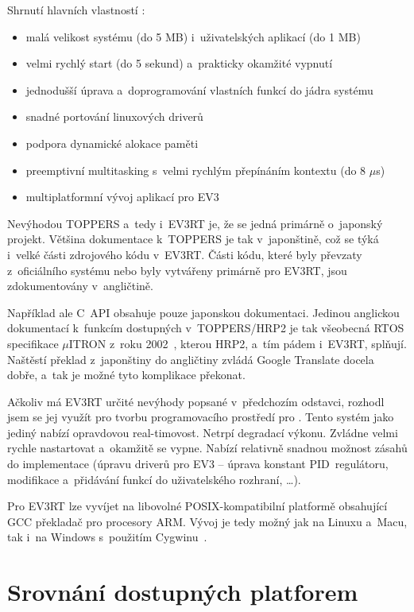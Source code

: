 Shrnutí hlavních vlastností \evRT:

\begin{itemize}
	\item malá velikost systému (do 5 MB) i~uživatelských aplikací (do 1 MB)
	\item velmi rychlý start (do 5 sekund) a~prakticky okamžité vypnutí
	\item jednodušší úprava a~doprogramování vlastních funkcí do jádra systému
	\item snadné portování linuxových driverů
	\item podpora dynamické alokace paměti
	\item preemptivní multitasking s~velmi rychlým přepínáním kontextu (do 8 $\mu$s)
	\item multiplatformní vývoj aplikací pro EV3
\end{itemize}
 
Nevýhodou TOPPERS a~tedy i~EV3RT je, že se jedná primárně o~japonský projekt. 
Většina dokumentace k~TOPPERS je tak v~japonštině, což se týká i~velké části zdrojového kódu v~EV3RT. 
Části kódu, které byly převzaty z~oficiálního \lego{} systému nebo byly vytvářeny primárně pro EV3RT, jsou zdokumentovány v~angličtině. 

Například ale C~API obsahuje pouze japonskou dokumentaci.
Jedinou anglickou dokumentací k~funkcím dostupných v~TOPPERS/HRP2 je tak všeobecná RTOS specifikace $\mu$ITRON z~roku 2002~\cite{legoProgramingPlatform_TOPPERS-IRON}, kterou HRP2, a~tím pádem i~EV3RT, splňují. %
Naštěstí překlad z~japonštiny do angličtiny zvládá Google Translate docela dobře, a~tak je možné tyto komplikace překonat.


Ačkoliv má EV3RT určité nevýhody popsané v~předchozím odstavci, rozhodl jsem se jej využít pro tvorbu programovacího prostředí pro \legoEV{}.
Tento systém jako jediný nabízí opravdovou real-timovost.
Netrpí degradací výkonu.
Zvládne velmi rychle nastartovat a~okamžitě se vypne. 
Nabízí relativně snadnou možnost zásahů do implementace (úpravu driverů pro EV3 -- úprava konstant PID~regulátoru, modifikace a~přidávání funkcí do uživatelského rozhraní, \dots). 

Pro EV3RT lze vyvíjet na libovolné POSIX-kompatibilní platformě obsahující GCC překladač pro procesory ARM. Vývoj je tedy možný jak na Linuxu a~Macu, tak i~na Windows s~použitím Cygwinu~\cite{legoProgramingPlatform_EV3RT-git-web_get-started}.


\section{Srovnání dostupných platforem}
\label{lego-soft-summary}

